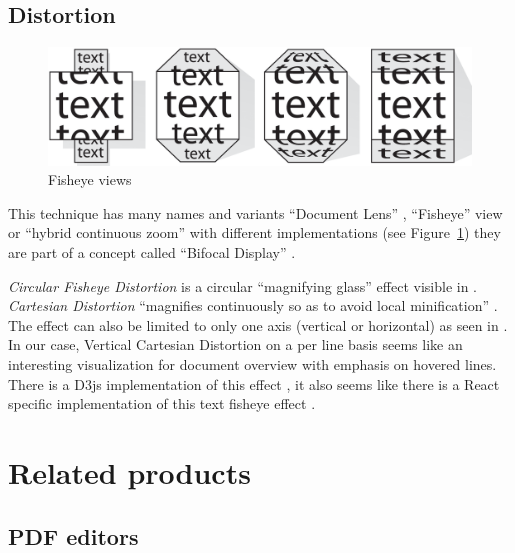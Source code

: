 \documentclass[\version]{l4proj}
\begin{document}
\subsection{Distortion}

\begin{figure}
    \includegraphics[width=\linewidth]{images/document_visualization/different-fisheyes.png}
    \caption{Fisheye views \autocite{baudischFishnetFisheyeWeb2004}
    }\label{fig:fisheyes}
    \vspace{-10pt}
\end{figure}

This technique has many names and variants ``Document Lens'' \autocite{robertsonDocumentLens1993}, ``Fisheye'' view \autocite{greenbergFisheyeTextEditor1996} or ``hybrid continuous zoom'' \autocite{bartramContinuousZoomConstrained1995} with different implementations (see Figure~\ref{fig:fisheyes}) they are part of a concept called ``Bifocal Display'' \autocite{apperleyBifocalDisplay}.

\textit{Circular Fisheye Distortion} is a circular ``magnifying glass'' effect visible in \textcite{bostockFisheyeGrid2019}. \textit{Cartesian Distortion} ``magnifies continuously so as to avoid local minification'' \autocite{bostockFisheyeDistortion2012}. The effect can also be limited to only one axis (vertical or horizontal) as seen in \textcite{pstuffaCartesianFisheyeDistortion2019}. In our case, Vertical Cartesian Distortion on a per line basis seems like an interesting visualization for document overview with emphasis on hovered lines. There is a D3js implementation of this effect \autocite{pstuffaCartesianFisheyeDistortion2019}, it also seems like there is a React specific implementation of this text fisheye effect \autocite{zhongVincentdchanReactfisheye2019}.

\section{Related products}

\subsection{PDF editors}
\end{document}
